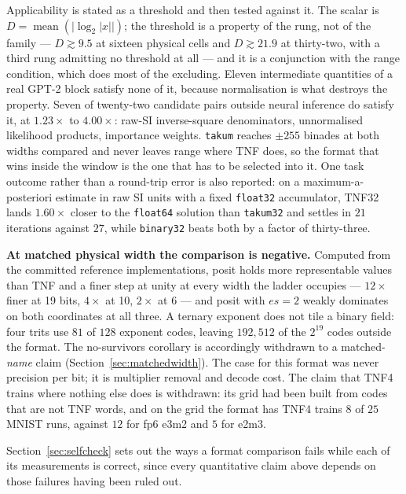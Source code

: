 Applicability is stated as a threshold and then tested against it. The scalar is
$D=\operatorname{mean}(\lvert\log_2|x|\rvert)$; the threshold is a property of the
rung, not of the family --- $D \gtrsim 9.5$ at sixteen physical cells and
$D \gtrsim 21.9$ at thirty-two, with a third rung admitting no threshold at all ---
and it is a conjunction with the range condition, which does most of the excluding.
Eleven intermediate quantities of a real GPT-2 block satisfy none of it, because
normalisation is what destroys the property. Seven of twenty-two candidate pairs
outside neural inference do satisfy it, at $1.23\times$ to $4.00\times$: raw-SI
inverse-square denominators, unnormalised likelihood products, importance weights.
\texttt{takum} reaches $\pm 255$ binades at both widths compared and never leaves
range where TNF does, so the format that wins inside the window is the one that has
to be selected into it. One task outcome rather than a round-trip error is also
reported: on a maximum-a-posteriori estimate in raw SI units with a fixed
\texttt{float32} accumulator, TNF32 lands $1.60\times$ closer to the
\texttt{float64} solution than \texttt{takum32} and settles in $21$ iterations
against $27$, while \texttt{binary32} beats both by a factor of thirty-three.

\textbf{At matched physical width the comparison is negative.} Computed from
the committed reference implementations, posit holds more representable values
than TNF and a finer step at unity at every width the ladder occupies --- $12\times$
finer at 19 bits, $4\times$ at 10, $2\times$ at 6 --- and posit with $es{=}2$ weakly
dominates on both coordinates at all three. A ternary exponent does not tile a
binary field: four trits use $81$ of $128$ exponent codes, leaving $192{,}512$ of
the $2^{19}$ codes outside the format. The no-survivors corollary is accordingly
withdrawn to a matched-\emph{name} claim (Section~\ref{sec:matchedwidth}). The
case for this format was never precision per bit; it is multiplier removal and
decode cost. The claim that TNF4 trains where nothing else does is withdrawn: its
grid had been built from codes that are not TNF words, and on the grid the format
has TNF4 trains $8$ of $25$ MNIST runs, against $12$ for fp6 e3m2 and $5$ for
e2m3.

Section~\ref{sec:selfcheck} sets out the ways a format comparison fails while
each of its measurements is correct, since every quantitative claim above depends
on those failures having been ruled out.
